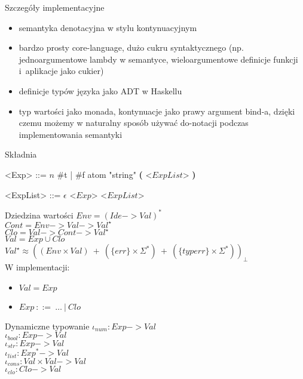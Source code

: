 \documentclass[12pt,serif]{beamer}
\begin{document}
\begin{frame}{Szczegóły implementacyjne}
\begin{itemize}
  \item semantyka denotacyjna w stylu kontynuacyjnym
  \item bardzo prosty core-language, dużo cukru syntaktycznego
        (np. jednoargumentowe lambdy w semantyce,
        wieloargumentowe definicje funkcji i~aplikacje jako cukier)
  \item definicje typów języka jako ADT w Haskellu
  \item typ wartości jako monada, kontynuacje jako prawy argument bind-a,
        dzięki czemu możemy w naturalny sposób używać do-notacji podczas
        implementowania semantyki
\end{itemize}
\end{frame}

\begin{frame}{Składnia}
\setlength{\grammarindent}{8em}
\begin{grammar}
<Exp> ::= $n$
\alt \#t | \#f
\alt atom
\alt "string"
\alt \textbf{(} <$ExpList$> \textbf{)}

<ExpList> ::= $\epsilon$
\alt <$Exp$> <$ExpList$>
\end{grammar}
\end{frame}

\begin{frame}{Dziedzina wartości}
$Env = (Ide -> Val)^{*}$ \\
$Cont = Env -> Val -> Val^{\star}$ \\
$Clo = Val -> Cont -> Val^{\star}$ \\
$Val = Exp \cup Clo$ \\
$Val^{\star} \approx ((Env \times Val)~+~(\{err\} \times \Sigma^{*})~+~(\{typerr\} \times \Sigma^{*}))_{\bot}$\newline
\\
\pause
W implementacji:
\begin{itemize}
  \item $Val = Exp$
  \item $Exp~::=~\ldots~|~Clo$
\end{itemize}
\end{frame}


\begin{frame}{Dynamiczne typowanie}
$\iota_{num} : Exp -> Val$ \\
$\iota_{bool} : Exp -> Val$ \\
$\iota_{str} : Exp -> Val$ \\
$\iota_{list} : Exp^{*} -> Val$ \\
$\iota_{cons} : Val \times Val -> Val$ \\
$\iota_{clo} : Clo -> Val$ \\
\end{frame}
\end{document}
